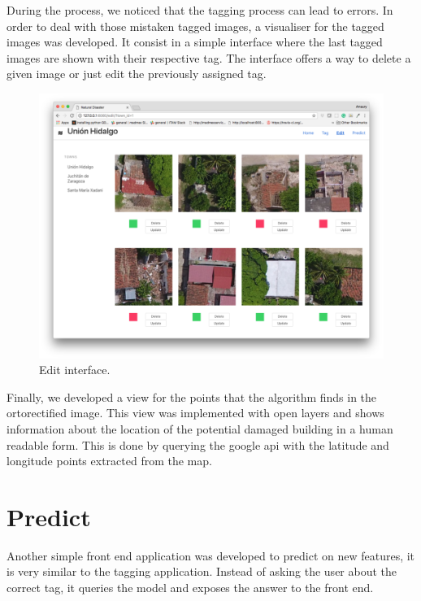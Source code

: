 During the process, we noticed that the tagging process can lead to errors. In order to deal with those mistaken tagged images, a visualiser for the tagged images was developed. It consist in a simple interface where the last tagged images are shown with their respective tag. The interface offers a way to delete a given image or just edit the previously assigned tag.

\begin{figure}[h]
  \centering
  \includegraphics[width=1\textwidth]{images/small-app-edit.png}
  \caption{Edit interface.}
  \label{fig:app-edit}
\end{figure}


Finally, we developed a view for the points that the algorithm finds in the ortorectified image. This view was implemented with open layers and shows information about the location of the potential damaged building in a human readable form. This is done by querying the google api with the latitude and longitude points extracted from the map.


\section{Predict}

Another simple front end application was developed to predict on new features, it is very similar to the tagging application. Instead of asking the user about the correct tag, it queries the model and exposes the answer to the front end.\\




